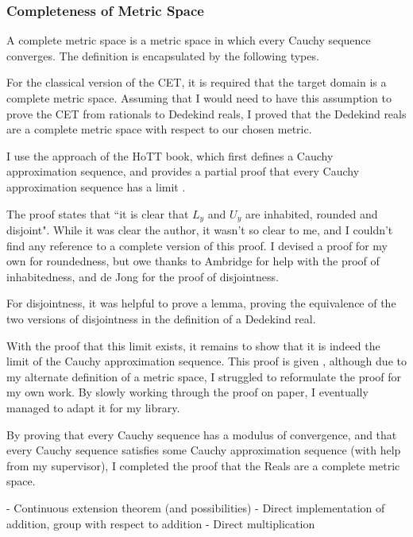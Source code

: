 \documentclass[ProjectReport]{subfiles}
\begin{document}
\subsubsection{Completeness of Metric Space}

A complete metric space is a metric space in which every Cauchy sequence converges. The definition is encapsulated by the following types. 


For the classical version of the CET, it is required that the target domain is a complete metric space. Assuming that I would need to have this assumption to prove the CET from rationals to Dedekind reals, I proved that the Dedekind reals are a complete metric space with respect to our chosen metric. 

I use the approach of the HoTT book, which first defines a Cauchy approximation sequence, and provides a partial proof that every Cauchy approximation sequence has a limit \cite[Theorem 11.2.12]{hottbook}.


The proof states that ``it is clear that $L_y$ and $U_y$ are inhabited, rounded and disjoint". While it was clear the author, it wasn't so clear to me, and I couldn't find any reference to a complete version of this proof. I devised a proof for my own for roundedness, but owe thanks to Ambridge for help with the proof of inhabitedness, and de Jong for the proof of disjointness.

For disjointness, it was helpful to prove a lemma, proving the equivalence of the two versions of disjointness in the definition of a Dedekind real. 


With the proof that this limit exists, it remains to show that it is indeed the limit of the Cauchy approximation sequence. This proof is given \cite{hottbook}, although due to my alternate definition of a metric space, I struggled to reformulate the proof for my own work. By slowly working through the proof on paper, I eventually managed to adapt it for my library.

By proving that every Cauchy sequence has a modulus of convergence, and that every Cauchy sequence satisfies some Cauchy approximation sequence (with help from my supervisor), I completed the proof that the Reals are a complete metric space.

- Continuous extension theorem (and possibilities)
- Direct implementation of addition, group with respect to addition
- Direct multiplication
\end{document}
